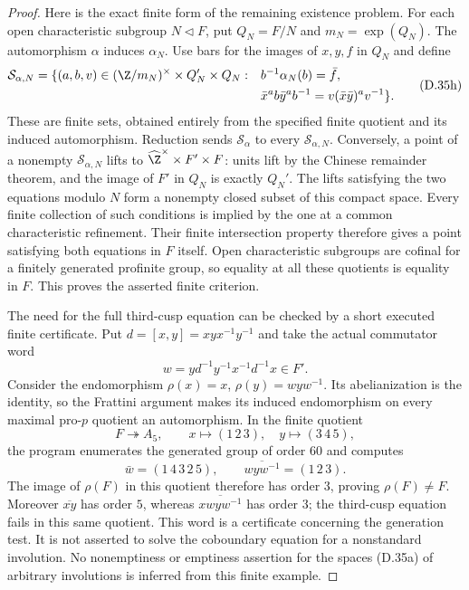 \begin{proof}
Here is the exact finite form of the remaining
existence problem.  For each open characteristic
subgroup $N\triangleleft F$, put $Q_N=F/N$ and
$m_N=\exp(Q_N)$.
The automorphism $\alpha$ induces $\alpha_N$.
Use bars for the images of $x,y,f$ in $Q_N$ and define
\[
\begin{split}
 \mathcal S_{\alpha,N}=\{(a,b,v)\in
       (\Z/m_N)^\times\times Q_N'\times Q_N:\quad&
       b^{-1}\alpha_N(b)=\bar f,\\
       &\bar x^a b\bar y^a b^{-1}
              =v(\bar x\bar y)^a v^{-1}\}.
\end{split}                                                       \tag{D.35h}
\]
These are finite sets, obtained entirely from the
specified finite quotient and its induced
automorphism.  Reduction sends
$\mathcal S_\alpha$ to every
$\mathcal S_{\alpha,N}$.
Conversely, a point of a nonempty
$\mathcal S_{\alpha,N}$ lifts to
$\widehat\Z^\times\times F'\times F$:
units lift by the Chinese remainder theorem,
and the image of $F'$ in $Q_N$ is exactly $Q_N'$.
The lifts satisfying the two equations modulo $N$
form a nonempty closed subset of this compact space.
Every finite collection of such conditions is
implied by the one at a common characteristic
refinement.  Their finite intersection property
therefore gives a point satisfying both equations
in $F$ itself.  Open characteristic subgroups are
cofinal for a finitely generated profinite group,
so equality at all these quotients is equality in
$F$.  This proves the asserted finite criterion.

The need for the full third-cusp equation can be
checked by a short executed finite certificate.
Put $d=[x,y]=xyx^{-1}y^{-1}$ and take the actual
commutator word
\[
                 w=y d^{-1}y^{-1}x^{-1}d^{-1}x\in F'.
\]
Consider the endomorphism
$\rho(x)=x$, $\rho(y)=wyw^{-1}$.
Its abelianization is the identity, so the Frattini
argument makes its induced endomorphism on every
maximal pro-$p$ quotient an automorphism.
In the finite quotient
\[
 F\twoheadrightarrow A_5,\qquad
             x\longmapsto(1\,2\,3),\quad
             y\longmapsto(3\,4\,5),
\]
the program
enumerates the generated group of order $60$ and
computes
\[
 \bar w=(1\,4\,3\,2\,5),\qquad
 \overline{wyw^{-1}}=(1\,2\,3).
\]
The image of $\rho(F)$ in this quotient therefore
has order $3$, proving $\rho(F)\ne F$.
Moreover $\overline{xy}$ has order $5$, whereas
$\overline{xwyw^{-1}}$ has order $3$; the
third-cusp equation fails in this same quotient.
This word is a certificate concerning the
generation test.  It is not asserted to solve
the coboundary equation for a nonstandard
involution.  No nonemptiness or emptiness
assertion for the spaces (D.35a) of arbitrary
involutions is inferred from this finite example.
\end{proof}

